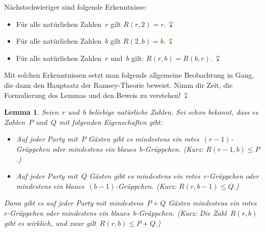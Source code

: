 \documentclass{../../zirkelblatt1718}
\theoremstyle{definition}
\theoremstyle{plain}
\newtheorem{lemma}[defn]{Lemma}
\theoremstyle{remark}
\newcommand{\happy}{\includegraphics[height=0.7em]{happy}\xspace}
\begin{document}
Nächstschwieriger sind folgende Erkenntnisse:

\begin{itemize}
\item Für alle natürlichen Zahlen~$r$ gilt $R(r,2) = r$.~\happy
\item Für alle natürlichen Zahlen~$b$ gilt $R(2,b) = b$.~\happy
\item Für alle natürlichen Zahlen~$r$ und~$b$ gilt: $R(r,b) = R(b,r)$.~\happy
\end{itemize}

Mit solchen Erkenntnissen setzt man folgende allgemeine Beobachtung in Gang, die
dann den Hauptsatz der Ramsey-Theorie beweist. Nimm dir Zeit, die Formulierung
des Lemmas und den Beweis zu verstehen!~\happy

\begin{lemma}Seien~$r$ und~$b$ beliebige natürliche Zahlen. Sei schon bekannt,
dass es Zahlen~$P$ und~$Q$ mit folgenden Eigenschaften gibt:
\begin{itemize}
\item Auf jeder Party mit~$P$ Gästen gibt es mindestens ein
rotes~$(r-1)$-Grüppchen oder mindestens ein blaues~$b$-Grüppchen.
(Kurz: $R(r-1,b) \leq P$.)
\item Auf jeder Party mit~$Q$ Gästen gibt es mindestens ein
rotes~$r$-Grüppchen oder mindestens ein blaues~$(b-1)$-Grüppchen.
(Kurz: $R(r,b-1) \leq Q$.)
\end{itemize}
Dann gibt es auf jeder Party mit mindestens~$P+Q$ Gästen mindestens ein
rotes~$r$-Grüppchen oder mindestens ein blaues~$b$-Grüppchen. (Kurz: Die
Zahl~$R(r,b)$ gibt es wirklich, und zwar gilt~$R(r,b) \leq P + Q$.)
\end{lemma}
\end{document}
